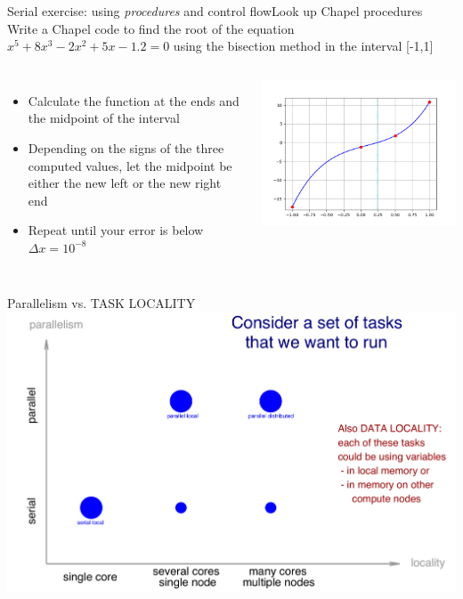 \documentclass[10pt,xcolor=pdftex,dvipsnames,table]{beamer}
\begin{document}
\begin{frame}{Serial exercise: using {\it procedures} and control flow}{Look up Chapel procedures}
  Write a Chapel code to find the root of the equation $x^5 + 8x^3 - 2x^2 + 5x - 1.2 = 0$ using the bisection
  method in the interval [-1,1]
  \begin{columns}[]
    \begin{itemize}\setlength{\itemsep}{3mm}
      \item Calculate the function at the ends and the midpoint of the interval
      \item Depending on the signs of the three computed values, let the midpoint be either the new left
      or the new right end
      \item Repeat until your error is below $\Delta x=10^{-8}$
    \end{itemize}
    \includegraphics[width=0.95\columnwidth]{figs/bisection.png}
  \end{columns}
\end{frame}

\begin{frame}{Parallelism vs. TASK LOCALITY}
  \includegraphics[width=1.0\columnwidth]{orthogonal.pdf}
\end{frame}
\end{document}
